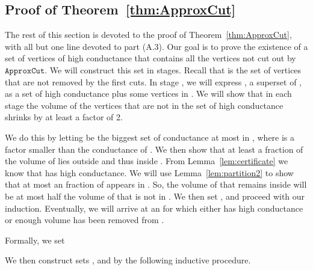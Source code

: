 \documentclass[11pt]{article}
\newcommand{\approxcut}{\ensuremath{\mathtt{ApproxCut}}}
\begin{document}
\subsection{Proof of Theorem~\ref{thm:ApproxCut}}
The rest of this section is devoted to the proof of Theorem~\ref{thm:ApproxCut}, with all but one
  line devoted to part (A.3).
Our goal is to prove the existence of a set of vertices  of high conductance
  that contains all the vertices not cut out by \approxcut .
We will construct this set  in stages.
Recall that  is the set of vertices
  that are not removed by the first  cuts.
In stage , we will express , a superset of , as a set of high
  conductance  plus some vertices in .
We will show that in each stage the volume of the vertices that are
  not in the set of high conductance shrinks by at least a factor of 2.

We do this by letting  be the biggest set of conductance at most
   in , where  is a factor  smaller
  than the conductance of .
We then show that at least a  fraction of the volume
  of  lies outside  and thus inside .
From Lemma~\ref{lem:certificate} we know that 
  has high conductance.
We will use Lemma~\ref{lem:partition2} to show that at most an 
  fraction of  appears in .
So, the volume of  that remains inside  will be at most
  half the volume of  that is not in .
We then set , and proceed
  with our induction.
Eventually, we will arrive at an  for which either  
  has high conductance or enough volume has been removed from .

\begin{figure}[h]
\centering
{} \qquad
{}
\end{figure}

Formally, we set 

We then construct sets ,  and  by the following
  inductive procedure.
\end{document}
